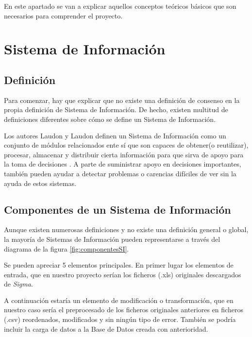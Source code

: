 
En este apartado se van a explicar aquellos conceptos teóricos básicos que son necesarios para comprender el proyecto.


\section{Sistema de Información}



\subsection{Definición}

Para comenzar, hay que explicar que no existe una definición de consenso en la propia definición de Sistema de Información. De hecho, existen multitud de definiciones diferentes sobre cómo se define un Sistema de Información.


Los autores Laudon y Laudon definen un Sistema de Información como un conjunto de módulos relacionados ente sí que son capaces de obtener(o reutilizar), procesar, almacenar y distribuir cierta información para que sirva de apoyo para la toma de decisiones \cite{vicen}.
A parte de suministrar apoyo en decisiones importantes, también pueden ayudar a detectar problemas o carencias difíciles de ver sin la ayuda de estos sistemas.


\subsection{Componentes de un Sistema de Información}
Aunque existen numerosas definiciones y no existe una definición general o global, la mayoría de Sistemas de Información pueden representarse a través del diagrama de la figura \ref{fig:componentesSI}.




Se pueden apreciar 5 elementos principales. En primer lugar los elementos de entrada, que en nuestro proyecto serían los ficheros (.xls) originales descargados de \emph{Sigma}. 

A continuación estaría un elemento de modificación o transformación, que en nuestro caso sería el preprocesado de los ficheros originales anteriores en ficheros (.csv) reordenados, modificados y sin ningún tipo de error. También se podría incluir la carga de datos a la Base de Datos creada con anterioridad.

